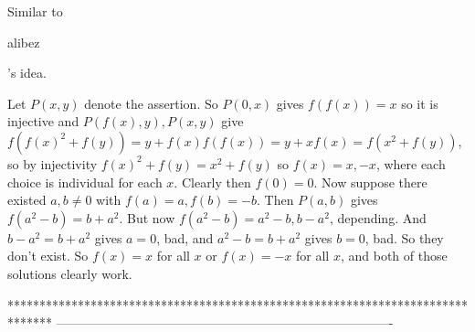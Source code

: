 


\begin{solution}
	Similar to \begin{bolded}alibez\end{bolded}'s idea.

Let $P(x, y)$ denote the assertion. So $P(0, x)$ gives $f(f(x)) = x$ so it is injective and $P(f(x), y), P(x, y)$ give $f(f(x)^2 + f(y)) = y + f(x)f(f(x)) = y + xf(x) = f(x^2 + f(y))$, so by injectivity $f(x)^2 + f(y) = x^2 + f(y)$ so $f(x) = x, -x$, where each choice is individual for each $x$. Clearly then $f(0) = 0$. Now suppose there existed $a, b \not= 0$ with $f(a) = a, f(b) = -b$. Then $P(a, b)$ gives $f(a^2 - b) = b + a^2$. But now $f(a^2 - b) = a^2 - b, b - a^2$, depending. And $b - a^2 = b + a^2$ gives $a = 0$, bad, and $a^2 - b = b + a^2$ gives $b = 0$, bad. So they don't exist. So $f(x) = x$ for all $x$ or $f(x) = -x$ for all $x$, and both of those solutions clearly work.
\end{solution}



*******************************************************************************
-------------------------------------------------------------------------------

